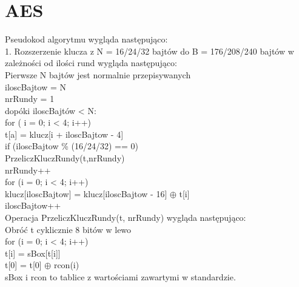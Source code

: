 \documentclass[oneside]{mgr}
\begin{document}
\chapter{AES}
Pseudokod algorytmu wygląda następująco:\vspace*{1 cm}\\
1. Rozszerzenie klucza z N = 16/24/32 bajtów do B = 176/208/240 bajtów w zależności od ilości rund wygląda następująco:\\
\hspace*{1 cm}Pierwsze N bajtów jest normalnie przepisywanych\\
\hspace*{1 cm}iloscBajtow = N\\
\hspace*{1 cm}nrRundy = 1\\
\hspace*{1 cm}dopóki iloscBajtów < N:\\
\hspace*{10mm}for ( i = 0; i < 4; i++)\\
\hspace*{20mm}t[a] = klucz[i + iloscBajtow - 4]\\
\hspace*{10mm}if (iloscBajtow \% (16/24/32) == 0)\\
\hspace*{20mm}PrzeliczKluczRundy(t,nrRundy)\\
\hspace*{20mm}nrRundy++\\
\hspace*{10mm}for (i = 0; i < 4; i++)\\
\hspace*{20mm}klucz[iloscBajtow] = klucz[iloscBajtow - 16] $\oplus$ t[i]\\
\hspace*{20mm}iloscBajtow++\\
Operacja PrzeliczKluczRundy(t, nrRundy) wygląda następująco:\\
\hspace*{10mm}Obróć t cyklicznie 8 bitów w lewo\\
\hspace*{10mm}for (i = 0; i < 4; i++)\\
\hspace*{20mm}t[i] = sBox[t[i]]\\
\hspace*{10mm}t[0] = t[0] $\oplus$ rcon(i)\\
sBox i rcon to tablice z wartościami zawartymi w standardzie.\vspace*{1 cm}\\
\end{document}
